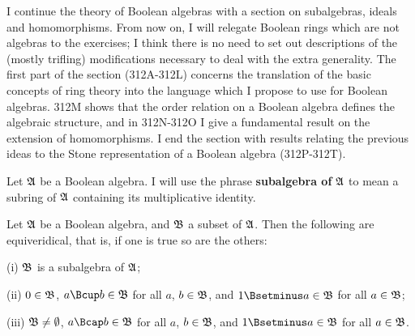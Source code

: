 
\def\chaptername{Boolean algebras}
\def\sectionname{Homomorphisms}
\def\IMPLY#1#2{{\bf (#1)$\Rightarrow$(#2)}}


I continue the theory of Boolean algebras with a section on subalgebras,
ideals and homomorphisms.   From now on, I will relegate Boolean rings
which are not algebras to the exercises;  I think there is no need to
set out descriptions of the (mostly trifling)
modifications necessary to deal
with the extra generality.   The first part of the section
(312A-312L) concerns the translation of the basic concepts of ring
theory into the language which I propose to use for Boolean algebras.
312M shows that the order relation on a Boolean algebra defines the
algebraic structure, and in 312N-312O I give a fundamental result on the
extension of homomorphisms.
I end the section with results relating the previous ideas to the Stone
representation of a Boolean algebra (312P-312T).

 Let $\frak A$ be a Boolean algebra.   I will
use the phrase {\bf subalgebra of} $\frak A$ to mean a subring of
$\frak A$ containing its multiplicative
identity.

 Let $\frak A$ be a Boolean algebra, and
$\frak B$ a subset of $\frak A$.   Then the following are equiveridical, that is, if one is true so are the others:

(i) $\frak B$ is a subalgebra of $\frak A$;

(ii) $0\in\frak B$, $a\Bcup b\in\frak B$ for all $a$, $b\in\frak B$, and
$1\Bsetminus a\in\frak B$ for all $a\in\frak B$;

(iii) $\frak B\ne\emptyset$, $a\Bcap b\in\frak B$ for all $a$,
$b\in\frak B$, and $1\Bsetminus a\in\frak B$ for all $a\in\frak B$.

